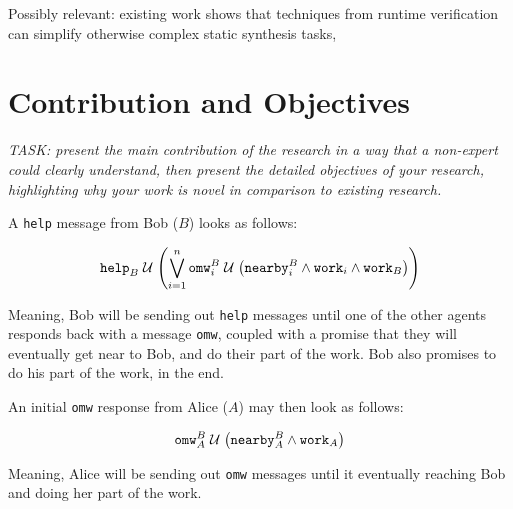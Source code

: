 \documentclass[conference]{IEEEtran}
\begin{document}
Possibly relevant: existing work shows that techniques from runtime
verification can simplify otherwise complex static synthesis
tasks\cite{2022-Runtime-Verification-Meets-Controller-Synthesis},


\section{Contribution and Objectives}

\emph{TASK: present the main contribution of the research in a way
that a non-expert could clearly understand, then present the detailed
objectives of your research, highlighting why your work is novel in
comparison to existing research.}



A \texttt{help} message from Bob ($B$) looks as follows:

\begin{align}
\mathtt{help}_B \until %
\p{\bigvee_{i=1}^n %
  \mathtt{omw}_i^B \until %
  \p{\mathtt{nearby}_i^B \wedge \mathtt{work}_i \wedge \mathtt{work}_B} %
} %
\end{align}

Meaning, Bob will be sending out \texttt{help} messages until one of
the other agents responds back with a message \texttt{omw}, coupled
with a promise that they will eventually get near to Bob, and do their
part of the work. Bob also promises to do his part of the work, in the
end.

An initial \texttt{omw} response from Alice ($A$) may then look as
follows:

\begin{align}
\mathtt{omw}^B_A \until %
  \p{\mathtt{nearby}_A^B \wedge \mathtt{work}_A}%
\end{align}

Meaning, Alice will be sending out \texttt{omw} messages until it
eventually reaching Bob and doing her part of the work.


\end{document}
